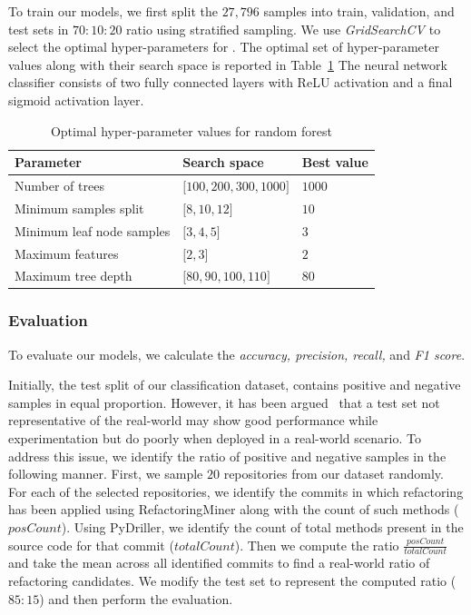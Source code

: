 To train our models, 
we first split the $27,796$ samples into train, validation, and test sets in $70:10:20$ ratio 
using stratified sampling. 
We use \textit{GridSearchCV}
to select the optimal hyper-parameters for \rf{}.
The optimal set of hyper-parameter values along with their search space is reported in Table~\ref{tab:rfparams}
The neural network classifier consists of two fully connected layers with ReLU activation and a final sigmoid activation layer.

\begin{table}[ht]
\captionsetup{skip=10pt}
\centering
\caption{Optimal hyper-parameter values for random forest}
\label{tab:rfparams}
\begin{tabular}{p{5cm}%
>{\raggedleft\arraybackslash}p{4cm}%
>{\raggedleft\arraybackslash}p{4cm}%
}
\textbf{Parameter} & \textbf{Search space} & \textbf{Best value} \\ \midrule
Number of trees & ${[}100, 200, 300, 1000{]}$ & $1000$ \\
Minimum samples split    & ${[}8, 10, 12{]}$           & $10$   \\
Minimum leaf node samples              & ${[}3, 4, 5{]}$             & $3$    \\
Maximum features              & ${[}2, 3{]}$                & $2$    \\
Maximum tree depth                    & ${[}80, 90, 100, 110{]}$    & $80$  \\\bottomrule
\end{tabular}
\end{table}

\subsubsection{Evaluation}

To evaluate our models, we calculate the \textit{accuracy, precision, recall,} and \textit{F1 score}.


Initially, the test split of our classification dataset, 
contains positive and negative samples in equal proportion. 
However, it has been argued~\cite{Sharma2021, DiNucci2018} that a test set not representative of the real-world may show good performance while experimentation 
but do poorly when deployed in a real-world scenario. 
To address this issue, 
we identify the ratio of positive and negative samples in the following manner. 
First, we sample $20$ repositories from our dataset randomly. 
For each of the selected repositories, we identify the commits in which \exm{} refactoring has been applied using RefactoringMiner along with the count of such methods ($posCount$). 
Using PyDriller, we identify the count of total methods present in the source code for that commit ($totalCount$). 
Then we compute the ratio $\frac{posCount}{totalCount}$ and take the mean across all identified commits to find a real-world ratio of \exm{} refactoring candidates. 
We modify the test set  to represent the computed ratio ($85:15$) and then perform the evaluation. 
